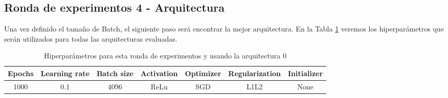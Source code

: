 \documentclass{article}
\begin{document}
      \subsection{Ronda de experimentos 4 - Arquitectura}
		\label{j-s-a0-e4} %
			Una vez definido el tama\~{n}o de Batch, el siguiente paso ser\'a encontrar la mejor arquitectura. En la Tabla \ref{tab:hip-j-a0-e4} veremos los hiperpar\'ametros que ser\'an utilizados para todas las arquitecturas evaluadas.
            
			\begin{table}[h!]
				\begin{center}
					\begin{tabular}{| c | c | c | c | c | c | c |}
						\textbf{Epochs} & \textbf{Learning rate} & \textbf{Batch size} & \textbf{Activation} & \textbf{Optimizer} & \textbf{Regularization} & \textbf{Initializer}\\ \hline
						1000 & 0.1 & 4096 & ReLu & SGD & L1L2 & None
					\end{tabular}
					\caption{Hiperpar\'ametros para esta ronda de experimentos y usando la arquitectura 0}
					\label{tab:hip-j-a0-e4}
				\end{center}
			\end{table}
			
\end{document}
